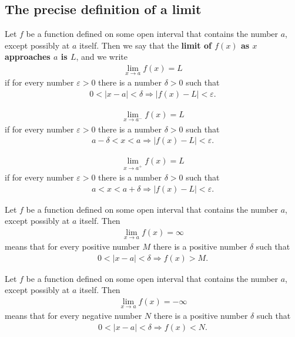\documentclass{article}
\begin{document}
\subsection{The precise definition of a limit}
\begin{definition}
    Let $f$ be a function defined on some open interval that contains the number $a$, except possibly at $a$ itself. Then we say that the \textbf{limit of $f(x)$ as $x$ approaches $a$ is $L$}, and we write
    \begin{align*}
        \lim_{x\to a}f(x) = L
    \end{align*}
    if for every number $\varepsilon>0$ there is a number $\delta>0$ such that
    \begin{align*}
        0<|x-a|<\delta \Rightarrow |f(x)-L|<\varepsilon.
    \end{align*}
\end{definition}
\begin{definition}
    \begin{align*}
        \lim_{x\to a^-}f(x) = L
    \end{align*}
    if for every number $\varepsilon > 0$ there is a number $\delta > 0$ such that
    \begin{align*}
        a-\delta < x < a \Rightarrow |f(x)-L| < \varepsilon.
    \end{align*}
\end{definition}
\begin{align*}
    \lim_{x\to a^+}f(x) = L
\end{align*}
if for every number $\varepsilon > 0$ there is a number $\delta > 0$ such that
\begin{align*}
    a < x < a+\delta \Rightarrow |f(x)-L| < \varepsilon.
\end{align*}
\begin{definition}
    Let $f$ be a function defined on some open interval that contains the number $a$, except possibly at $a$ itself. Then
    \begin{align*}
        \lim_{x\to a}f(x) = \infty
    \end{align*}
    means that for every positive number $M$ there is a positive number $\delta$ such that
    \begin{align*}
        0<|x-a|<\delta \Rightarrow f(x)>M.
    \end{align*}
\end{definition}
\begin{definition}
    Let $f$ be a function defined on some open interval that contains the number $a$, except possibly at $a$ itself. Then
    \begin{align*}
        \lim_{x\to a}f(x) = -\infty
    \end{align*}
    means that for every negative number $N$ there is a positive number $\delta$ such that
    \begin{align*}
        0<|x-a|<\delta \Rightarrow f(x)<N.
    \end{align*}
\end{definition}
\end{document}
